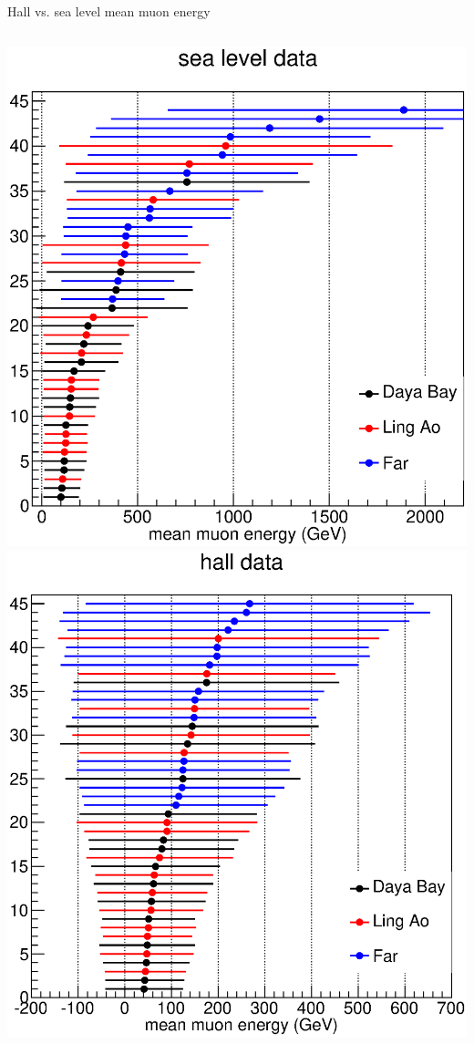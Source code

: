 \documentclass{beamer}
\begin{document}
\begin{frame}{Hall vs. sea level mean muon energy}
	\begin{columns}[c]
			\centering
			\includegraphics[height=\textwidth]{CompDavid_sea.eps}
			\centering
			\includegraphics[height=\textwidth]{CompDavid_hall.eps}
	\end{columns}
\end{frame}
\end{document}
